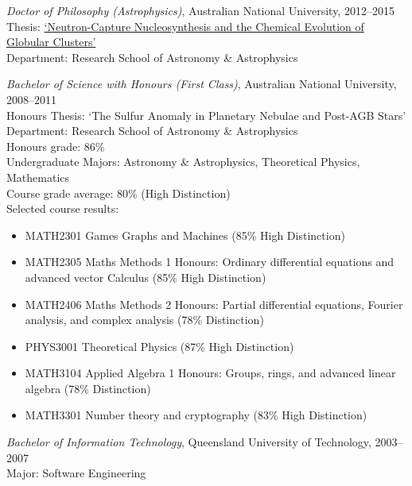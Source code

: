 \documentclass[11pt]{res} %
\begin{document}
\begin{resume}
  {\it Doctor of Philosophy (Astrophysics)}, Australian National University, 2012--2015\\
  Thesis: \href{https://openresearch-repository.anu.edu.au/handle/1885/16507}{`Neutron-Capture Nucleosynthesis and the Chemical Evolution of Globular Clusters'}\\
  Department: Research School of Astronomy \& Astrophysics

  {\it Bachelor of Science with Honours (First Class)}, Australian National University, 2008--2011\\
  Honours Thesis: `The Sulfur Anomaly in Planetary Nebulae and Post-AGB Stars'\\
  Department: Research School of Astronomy \& Astrophysics\\
  Honours grade: 86\%\\
  Undergraduate Majors: Astronomy \& Astrophysics, Theoretical Physics, Mathematics\\
  Course grade average: 80\% (High Distinction)\\
  Selected course results:
  \begin{itemize}[leftmargin=*]
    \item MATH2301 Games Graphs and Machines (85\% High Distinction)
    \item MATH2305 Maths Methods 1 Honours: Ordinary differential equations and advanced vector Calculus (85\% High Distinction)
    \item MATH2406 Maths Methods 2 Honours: Partial differential equations, Fourier analysis, and complex analysis (78\% Distinction)
    \item PHYS3001 Theoretical Physics (87\% High Distinction)
    \item MATH3104 Applied Algebra 1 Honours: Groups, rings, and advanced linear algebra (78\% Distinction)
    \item MATH3301 Number theory and cryptography (83\% High Distinction)
  \end{itemize}

  {\it Bachelor of Information Technology}, Queensland University of Technology, 2003--2007\\
  Major: Software Engineering


\end{resume}
\end{document}
